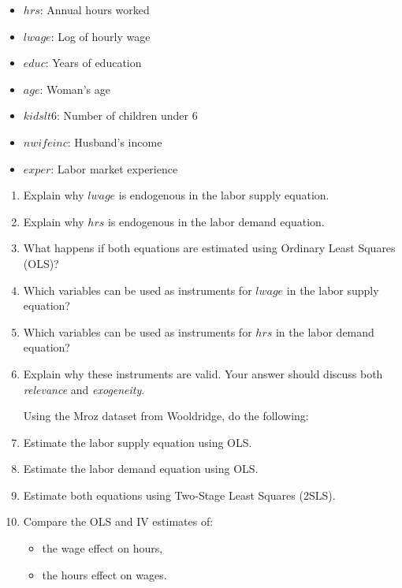 \documentclass[12pt]{article}
\begin{document}
\begin{itemize}
  \item $hrs$: Annual hours worked  
  \item $lwage$: Log of hourly wage  
  \item $educ$: Years of education  
  \item $age$: Woman’s age  
  \item $kidslt6$: Number of children under 6  
  \item $nwifeinc$: Husband’s income  
  \item $exper$: Labor market experience  
\end{itemize}
\begin{enumerate}
    \item Explain why $lwage$ is endogenous in the labor supply equation.
    \item Explain why $hrs$ is endogenous in the labor demand equation.
    \item What happens if both equations are estimated using Ordinary Least Squares (OLS)?





    \item Which variables can be used as instruments for $lwage$ in the labor supply equation?
    \item Which variables can be used as instruments for $hrs$ in the labor demand equation?
    \item Explain why these instruments are valid. Your answer should discuss both \textit{relevance} and \textit{exogeneity}.




Using the Mroz dataset from Wooldridge, do the following:


    \item Estimate the labor supply equation using OLS.
    \item Estimate the labor demand equation using OLS.
    \item Estimate both equations using Two-Stage Least Squares (2SLS).
    \item Compare the OLS and IV estimates of:
    \begin{itemize}
        \item the wage effect on hours,
        \item the hours effect on wages.
    \end{itemize}
\end{enumerate}
\end{document}
